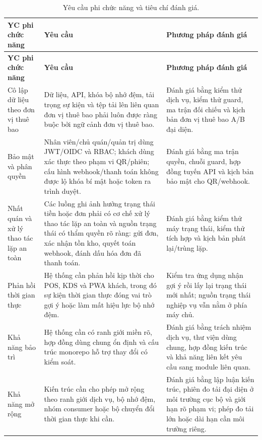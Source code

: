 \begin{longtable}{@{}>{\raggedright\arraybackslash}p{}>{\raggedright\arraybackslash}p{}>{\raggedright\arraybackslash}p{}@{}}
\caption{Yêu cầu phi chức năng và tiêu chí đánh giá.}
\label{tab:chapter3-non-functional-requirements}\\
\toprule
\textbf{YC phi chức năng} & \textbf{Yêu cầu} & \textbf{Phương pháp đánh giá} \\
\midrule
\endfirsthead
\toprule
\textbf{YC phi chức năng} & \textbf{Yêu cầu} & \textbf{Phương pháp đánh giá} \\
\midrule
\endhead
Cô lập dữ liệu theo đơn vị thuê bao & Dữ liệu, API, khóa bộ nhớ đệm, tải trọng sự kiện và tệp tải lên liên quan đơn vị thuê bao phải luôn được ràng buộc bởi ngữ cảnh đơn vị thuê bao. & Đánh giá bằng kiểm thử dịch vụ, kiểm thử guard, ma trận đối chiếu và kịch bản đơn vị thuê bao A/B đại diện. \\
\addlinespace
Bảo mật và phân quyền & Nhân viên/chủ quán/quản trị dùng JWT/OIDC và RBAC; khách dùng xác thực theo phạm vi QR/phiên; cấu hình webhook/thanh toán không được lộ khóa bí mật hoặc token ra trình duyệt. & Đánh giá bằng ma trận quyền, chuỗi guard, hợp đồng tuyến API và kịch bản bảo mật cho QR/webhook. \\
\addlinespace
Nhất quán và xử lý thao tác lặp an toàn & Các luồng ghi ảnh hưởng trạng thái tiền hoặc đơn phải có cơ chế xử lý thao tác lặp an toàn và nguồn trạng thái có thẩm quyền rõ ràng: gửi đơn, xác nhận tồn kho, quyết toán webhook, đánh dấu hóa đơn đã thanh toán. & Đánh giá bằng kiểm thử máy trạng thái, kiểm thử tích hợp và kịch bản phát lại/trùng lặp. \\
\addlinespace
Phản hồi thời gian thực & Hệ thống cần phản hồi kịp thời cho POS, KDS và PWA khách, trong đó sự kiện thời gian thực đóng vai trò gợi ý hoặc làm mất hiệu lực bộ nhớ đệm. & Kiểm tra ứng dụng nhận gợi ý rồi lấy lại trạng thái mới nhất; nguồn trạng thái nghiệp vụ vẫn nằm ở phía máy chủ. \\
\addlinespace
Khả năng bảo trì & Hệ thống cần có ranh giới miền rõ, hợp đồng dùng chung ổn định và cấu trúc monorepo hỗ trợ thay đổi có kiểm soát. & Đánh giá bằng trách nhiệm dịch vụ, thư viện dùng chung, hợp đồng kiến trúc và khả năng liên kết yêu cầu sang module liên quan. \\
\addlinespace
Khả năng mở rộng & Kiến trúc cần cho phép mở rộng theo ranh giới dịch vụ, bộ nhớ đệm, nhóm consumer hoặc bộ chuyển đổi thời gian thực khi cần. & Đánh giá bằng lập luận kiến trúc, phiên đo tải đại diện ở môi trường cục bộ và giới hạn rõ phạm vi; phép đo tải lớn hoặc dài hạn cần môi trường riêng. \\

\end{longtable}
